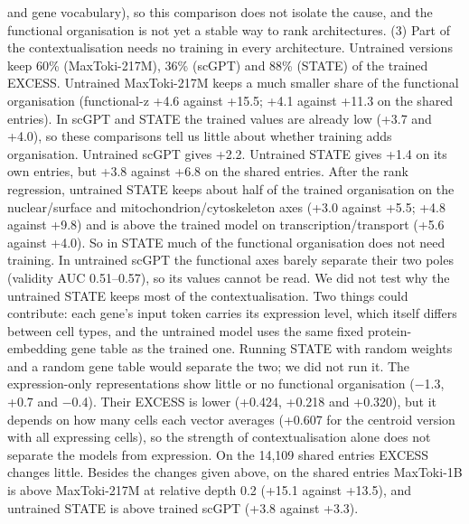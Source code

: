 \documentclass[
  11pt,
]{article}
\begin{document}
and gene vocabulary), so this comparison does not isolate the cause, and
the functional organisation is not yet a stable way to rank
architectures. (3) Part of the contextualisation needs no training in
every architecture. Untrained versions keep 60\% (MaxToki-217M), 36\%
(scGPT) and 88\% (STATE) of the trained EXCESS. Untrained MaxToki-217M
keeps a much smaller share of the functional organisation (functional-z
+4.6 against +15.5; +4.1 against +11.3 on the shared entries). In scGPT
and STATE the trained values are already low (+3.7 and +4.0), so these
comparisons tell us little about whether training adds organisation.
Untrained scGPT gives +2.2. Untrained STATE gives +1.4 on its own
entries, but +3.8 against +6.8 on the shared entries. After the rank
regression, untrained STATE keeps about half of the trained organisation
on the nuclear/surface and mitochondrion/cytoskeleton axes (+3.0 against
+5.5; +4.8 against +9.8) and is above the trained model on
transcription/transport (+5.6 against +4.0). So in STATE much of the
functional organisation does not need training. In untrained scGPT the
functional axes barely separate their two poles (validity AUC
0.51--0.57), so its values cannot be read. We did not test why the
untrained STATE keeps most of the contextualisation. Two things could
contribute: each gene's input token carries its expression level, which
itself differs between cell types, and the untrained model uses the same
fixed protein-embedding gene table as the trained one. Running STATE
with random weights and a random gene table would separate the two; we
did not run it. The expression-only representations show little or no
functional organisation (−1.3, +0.7 and −0.4). Their EXCESS is lower
(+0.424, +0.218 and +0.320), but it depends on how many cells each
vector averages (+0.607 for the centroid version with all expressing
cells), so the strength of contextualisation alone does not separate the
models from expression. On the 14,109 shared entries EXCESS changes
little. Besides the changes given above, on the shared entries
MaxToki-1B is above MaxToki-217M at relative depth 0.2 (+15.1 against
+13.5), and untrained STATE is above trained scGPT (+3.8 against +3.3).
\end{document}
